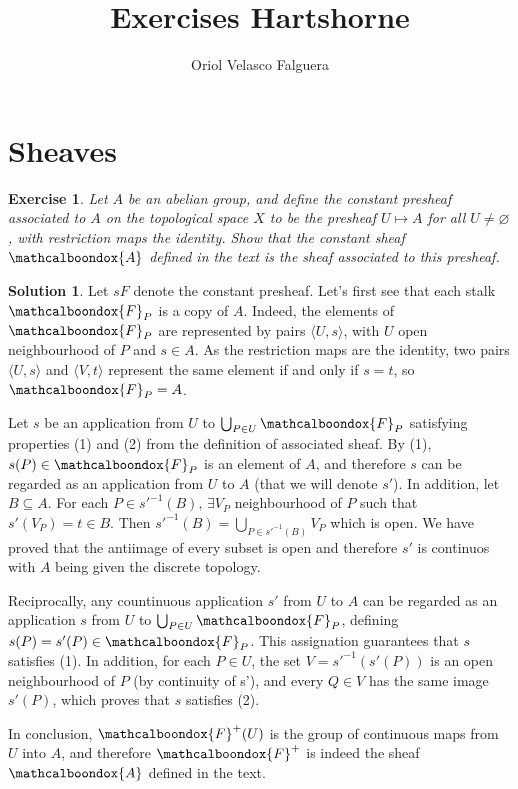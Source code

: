 \documentclass[12pt]{article}
\newtheorem{ex}{Exercise}[section]
\theoremstyle{definition}
\newtheorem*{sol}{Solution}
\newcommand{\sF}{\ensuremath{\mathcalboondox{F}}}
\newcommand{\sA}{\ensuremath{\mathcalboondox{A}}}
\begin{document}
\title{Exercises Hartshorne}
\author{Oriol Velasco Falguera}
\maketitle

\section{Sheaves}

\begin{ex}
	Let $A$ be an abelian group, and define the constant presheaf associated to $A$ on the topological space $X$ to be the presheaf $U \mapsto A$ for all $U \neq \varnothing$, with restriction maps the identity. Show that the constant sheaf $\sA$ defined in the text is the sheaf associated to this presheaf.
\end{ex}

\begin{sol}
	Let $sF$ denote the constant presheaf. Let's first see that each stalk $\sF_P$ is a copy of $A$. Indeed, the elements of $\sF_P$ are represented by pairs $\langle U, s \rangle$, with $U$ open neighbourhood of $P$ and $s \in A$. As the restriction maps are the identity, two pairs $\langle U,s \rangle$ and $\langle V, t \rangle$ represent the same element if and only if $s = t$, so $\sF_P = A$.

	Let $s$ be an application from $U$ to $\bigcup_{P \in U} \sF_P$ satisfying properties (1) and (2) from the definition of associated sheaf. By (1), $s(P) \in \sF_P$ is an element of $A$, and therefore $s$ can be regarded as an application from $U$ to $A$ (that we will denote $s'$). In addition, let $B \subseteq A$. For each $P \in s'^{-1}(B), \, \exists V_{P}$ neighbourhood of $P$ such that $s'(V_P) = t \in B$. Then $s'^{-1}(B) = \bigcup_{P \in s'^{-1}(B)} V_P$ which is open. We have proved that the antiimage of every subset is open and therefore $s'$ is continuos with $A$ being given the discrete topology.

	Reciprocally, any countinuous application $s'$ from $U$ to $A$ can be regarded as an application $s$ from $U$ to $\bigcup_{P \in U} \sF_P$, defining $s(P) = s'(P) \in \sF_P$. This assignation guarantees that $s$ satisfies (1). In addition, for each $P \in U$, the set $V = s'^{-1}(s'(P))$ is an open neighbourhood of $P$ (by continuity of s'), and every $Q \in V$ has the same image $s'(P)$, which proves that $s$ satisfies (2).

	In conclusion, $\sF^{+}(U)$ is the group of continuous maps from $U$ into $A$, and therefore $\sF^{+}$ is indeed the sheaf $\sA$ defined in the text.
\end{sol}
\end{document}
